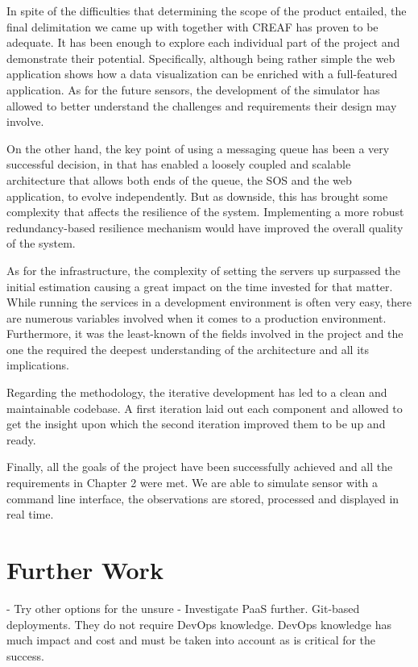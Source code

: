 In spite of the difficulties that determining the scope of the product entailed, the final delimitation we came up with together with CREAF has proven to be adequate. It has been enough to explore each individual part of the project and demonstrate their potential. Specifically, although being rather simple the web application shows how a data visualization can be enriched with a full-featured application. As for the future sensors, the development of the simulator has allowed to better understand the challenges and requirements their design may involve.

On the other hand, the key point of using a messaging queue has been a very successful decision, in that has enabled a loosely coupled and scalable architecture that allows both ends of the queue, the SOS and the web application, to evolve independently. But as downside, this has brought some complexity that affects the resilience of the system. Implementing a more robust redundancy-based resilience mechanism would have improved the overall quality of the system.

As for the infrastructure, the complexity of setting the servers up surpassed the initial estimation causing a great impact on the time invested for that matter. While running the services in a development environment is often very easy, there are numerous variables involved when it comes to a production environment. Furthermore, it was the least-known of the fields involved in the project and the one the required the deepest understanding of the architecture and all its implications.

Regarding the methodology, the iterative development has led to a clean and maintainable codebase. A first iteration laid out each component and allowed to get the insight upon which the second iteration improved them to be up and ready.

Finally, all the goals of the project have been successfully achieved and all the requirements in Chapter 2 were met. We are able to simulate sensor with a command line interface, the observations are stored, processed and displayed in real time.

\section{Further Work}

- Try other options for the unsure
- Investigate PaaS further. Git-based deployments. They do not require DevOps knowledge. DevOps knowledge has much impact and cost and must be taken into account as is critical for the success.

